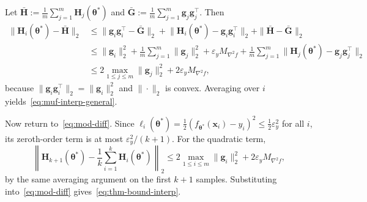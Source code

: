 \documentclass[10pt,letterpaper]{article}
\theoremstyle{definition}
\begin{document}
Let $\bar{\mathbf{H}}:=\frac{1}{m}\sum_{j=1}^{m}\mathbf{H}_j(\boldsymbol{\theta}^*)$ and
$\bar{\mathbf{G}}:=\frac{1}{m}\sum_{j=1}^{m}\mathbf{g}_j\mathbf{g}_j^\top$.
Then
\begin{align*}
  \|\mathbf{H}_i(\boldsymbol{\theta}^*)-\bar{\mathbf{H}}\|_2
  &\le \|\mathbf{g}_i\mathbf{g}_i^\top-\bar{\mathbf{G}}\|_2
    + \bigl\|\mathbf{H}_i(\boldsymbol{\theta}^*)-\mathbf{g}_i\mathbf{g}_i^\top\bigr\|_2
    + \|\bar{\mathbf{H}}-\bar{\mathbf{G}}\|_2 \\
  &\le \|\mathbf{g}_i\|_2^2 + \frac{1}{m}\sum_{j=1}^{m}\|\mathbf{g}_j\|_2^2
    + \varepsilon_y M_{\nabla^2 f}
    + \frac{1}{m}\sum_{j=1}^{m}\bigl\|\mathbf{H}_j(\boldsymbol{\theta}^*)-\mathbf{g}_j\mathbf{g}_j^\top\bigr\|_2 \\
  &\le 2\max_{1\le j\le m}\|\mathbf{g}_j\|_2^2 + 2\varepsilon_y M_{\nabla^2 f},
\end{align*}
because $\|\mathbf{g}_i\mathbf{g}_i^\top\|_2=\|\mathbf{g}_i\|_2^2$ and $\|\cdot\|_2$ is convex.
Averaging over $i$ yields~\eqref{eq:muf-interp-general}.

Now return to~\eqref{eq:mod-diff}. Since $\ell_i(\boldsymbol{\theta}^*)=\tfrac12(f_{\boldsymbol{\theta}^*}(\mathbf{x}_i)-y_i)^2\le \tfrac12\varepsilon_y^2$ for all $i$,
its zeroth-order term is at most $\varepsilon_y^2/(k+1)$.
For the quadratic term,
\[
  \left\| \mathbf{H}_{k+1}(\boldsymbol{\theta}^*) - \frac{1}{k}\sum_{i=1}^{k}\mathbf{H}_i(\boldsymbol{\theta}^*) \right\|_2
  \le 2\max_{1\le i\le m}\|\mathbf{g}_i\|_2^2 + 2\varepsilon_y M_{\nabla^2 f},
\]
by the same averaging argument on the first $k+1$ samples.
Substituting into~\eqref{eq:mod-diff} gives~\eqref{eq:thm-bound-interp}.
\end{document}
